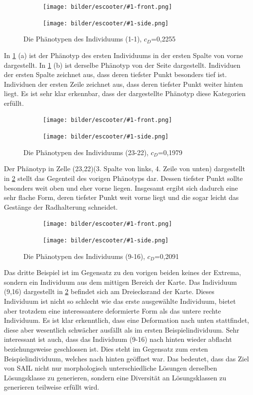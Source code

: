\newcommand{\escooterpheno}[2]{
\begin{figure}[h]
	\centering
	\begin{subfigure}[t]{0.5\textwidth}
		\centering
		\texttt{[image: bilder/escooter/\#1-front.png]}
		\subcaption{vorne}
	\end{subfigure}\hfill
	\begin{subfigure}[t]{0.5\textwidth}
		\centering
		\texttt{[image: bilder/escooter/\#1-side.png]}
		\subcaption{Seite}
	\end{subfigure}
\caption{Die Phänotypen des Individuums (#1), $c_D$=#2}
\label{fig:escooterpheno#1}
\end{figure}
}

\newcommand{\escref}[1]{
	\cref{fig:escooterpheno#1}
}

\escooterpheno{1-1}{0,2255}

In \escref{1-1} (a) ist der Phänotyp des ersten Individuums in der ersten Spalte von vorne dargestellt.
In \escref{1-1} (b) ist derselbe Phänotyp von der Seite dargestellt.
Individuen der ersten Spalte zeichnet aus, dass deren tiefster Punkt besonders tief ist.
Individuen der ersten Zeile zeichnet aus, dass deren tiefster Punkt weiter hinten liegt.
Es ist sehr klar erkennbar, dass der dargestellte Phänotyp diese Kategorien erfüllt.


\escooterpheno{23-22}{0,1979}

Der Phänotyp in Zelle (23,22)(3. Spalte von links, 4. Zeile von unten) dargestellt in \escref{23-22} stellt das Gegenteil des vorigen Phänotyps dar.
Dessen tiefster Punkt sollte besonders weit oben und eher vorne liegen.
Insgesamt ergibt sich dadurch eine sehr flache Form, deren tiefster Punkt weit vorne liegt und die sogar leicht das Gestänge der Radhalterung schneidet.

\escooterpheno{9-16}{0,2091}

Das dritte Beispiel ist im Gegensatz zu den vorigen beiden keines der Extrema, sondern ein Individuum aus dem mittigen Bereich der Karte.
Das Individuum (9,16) dargestellt in \escref{23-22} befindet sich am Dreiecksrand der Karte.
Dieses Individuum ist nicht so schlecht wie das erste ausgewählte Individuum, bietet aber trotzdem eine interessantere deformierte Form als das untere rechte Individuum.
Es ist klar erkenntlich, dass eine Deformation nach unten stattfindet, diese aber wesentlich schwächer ausfällt als im ersten Beispielindividuum.
Sehr interessant ist auch, dass das Individuum (9-16) nach hinten wieder abflacht beziehungsweise geschlossen ist.
Dies steht im Gegensatz zum ersten Beispielindividuum, welches nach hinten geöffnet war.
Das bedeutet, dass das Ziel von SAIL nicht nur morphologisch unterschiedliche Lösungen derselben Lösungsklasse zu generieren, sondern eine Diversität an Lösungsklassen zu generieren teilweise erfüllt wird.

